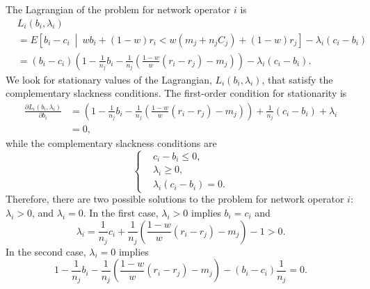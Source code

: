 The Lagrangian of the problem for network operator $i$ is
\begin{align}
	&L_i(b_i,\lambda_i) \nonumber\\
	&= E \left[ b_i-c_i \:\middle\vert\: wb_i + (1-w)r_i < w(m_j + n_j C_j) + (1-w)r_j\right] - \lambda_i(c_i-b_i) \nonumber\\
	&= (b_i-c_i)\left(1-\frac{1}{n_j}b_i - \frac{1}{n_j}\left(\frac{1-w}{w}(r_i-r_j)-m_j\right)\right) - \lambda_i(c_i-b_i).
	\label{eq:pcomp_langrangean_bidder_i_direct}
\end{align}
We look for stationary values of the Lagrangian, $L_i(b_i,\lambda_i)$, that satisfy the complementary slackness conditions. The first-order condition for stationarity is
\begin{align*}
	\frac{\partial L_i(b_i,\lambda_i)}{\partial b_i} &= \left( 1 - \frac{1}{n_j}b_i - \frac{1}{n_j}\left( \frac{1-w}{w}(r_i-r_j)-m_j \right) \right) + \frac{1}{n_j}\left(c_i-b_i\right) + \lambda_i\nonumber\\
	&=0,
\end{align*}
while the complementary slackness conditions are
\begin{equation*}
	\left\{
	\begin{array}{ll}
		&c_i-b_i\le 0,\\
		&\lambda_i\ge 0,\\
		&\lambda_i(c_i-b_i) = 0.
	\end{array}
	\right.
\end{equation*}
Therefore, there are two possible solutions to the problem for network operator $i$: $\lambda_i > 0$, and $\lambda_i=0$. In the first case, $\lambda_i > 0$ implies $b_i = c_i$ and
\begin{equation*}
	\lambda_i = \frac{1}{n_j}c_i + \frac{1}{n_j}\left( \frac{1-w}{w}(r_i-r_j) - m_j \right) - 1 > 0.
\end{equation*}
In the second case, $\lambda_i = 0$ implies
\begin{equation*}
	1 - \frac{1}{n_j}b_i - \frac{1}{n_j}\left( \frac{1-w}{w}(r_i-r_j) - m_j \right) - (b_i-c_i)\frac{1}{n_j} = 0.
\end{equation*}

